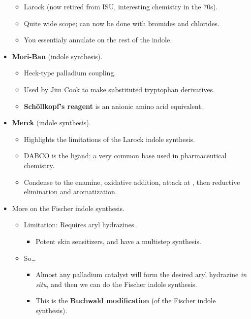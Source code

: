 \documentclass[../notes.tex]{subfiles}
\begin{document}
\begin{itemize}
    \begin{itemize}
        \item Larock (now retired from ISU, interesting chemistry in the 70s).
        \item Quite wide scope; can now be done with bromides and chlorides.
        \item You essentialy annulate on the rest of the indole.
    \end{itemize}
    \item \textbf{Mori-Ban} (indole synthesis).
    \begin{itemize}
        \item Heck-type palladium coupling.
        \item Used by Jim Cook to make substituted tryptophan derivatives.
        \item \textbf{Sch\"{o}llkopf's reagent} is an anionic amino acid equivalent.
    \end{itemize}
    \item \textbf{Merck} (indole synthesis).
    \begin{itemize}
        \item Highlights the limitations of the Larock indole synthesis.
        \item DABCO is the ligand; a very common base used in pharmaceutical chemistry.
        \item Condense to the enamine, oxidative addition, attack at , then reductive elimination and aromatization.
    \end{itemize}
    \item More on the Fischer indole synthesis.
    \begin{itemize}
        \item Limitation: Requires aryl hydrazines.
        \begin{itemize}
            \item Potent skin sensitizers, and have a multistep synthesis.
        \end{itemize}
        \item So\dots
        \begin{itemize}
            \item Almost any palladium catalyst will form the desired aryl hydrazine \emph{in situ}, and then we can do the Fischer indole synthesis.
            \item This is the \textbf{Buchwald modification} (of the Fischer indole synthesis).
        \end{itemize}
    \end{itemize}

\end{itemize}
\end{document}
